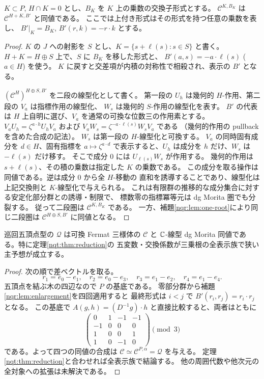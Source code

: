 \begin{lemma}[差ベクトルを加えるときの乗数]\label{nqr:lem:enlargement}
$K\subset P$, $H\cap K=0$ とし、$B_K$ を $K$ 上の乗数の交換子形式とする。
$\mathcal C^{K,B_K}$ は $\mathcal C^{H+K,B'}$ と同値である。
ここでは上付き形式はその形式を持つ任意の乗数を表し、
$B'|_K=B_K$, $B'(r,k)=-r\cdot k$ とする。
\end{lemma}
\begin{proof}
$K$ の $J$ への射影を $S$ とし、$K=\{s+\ell(s):s\in S\}$ と書く。
$H+K=H\oplus S$ 上で、$S$ に $B_K$ を移した形式と、
$B'(a,s)=-a\cdot\ell(s)$ ($a\in H$) を使う。
$K$ に戻すと交差項が内積の対称性で相殺され、表示の $B'$ となる。

$(\mathcal C^H)^{H\oplus S,B'}$ を二段の線型化として書く。
第一段の $U_h$ は幾何的 $H$-作用、第二段の $V_a$ は指標作用の線型化、
$W_s$ は幾何的 $S$-作用の線型化を表す。
$B'$ の代表は $H$ 上自明に選び、$V_a$ を通常の可換な位数三の作用素とする。
$V_aU_h=\zeta^{a\cdot h}U_hV_a$ および
$V_aW_s=\zeta^{-a\cdot\ell(s)}W_sV_a$ である
（幾何的作用の pullback を含めた合成の記法）。
$W_s$ は第一段の $H$-線型化と可換する。
$V_a$ の同時固有成分を $d\in H$、固有指標を $a\mapsto\zeta^{a\cdot d}$
で表示すると、$U_h$ は成分を $h$ だけ、$W_s$ は $-\ell(s)$ だけ移す。
そこで成分 $0$ には $U_{\ell(s)}W_s$ が作用する。
幾何的作用は $s+\ell(s)$、その積の乗数は指定した $K$ の乗数である。
この成分を取る操作は同値である。逆は成分 $0$ から全 $H$-移動の
直和を誘導することであり、線型化は上記交換則と $K$-線型化で与えられる。
これは有限群の推移的な成分集合に対する安定化部分群との誘導・制限で、
標数零の指標冪等元は dg Morita 圏でも分裂する。
従って二段圏は $\mathcal C^{K,B_K}$ である。
一方、補題\ref{nqr:lem:one-root}により同じ二段圏は
$\mathcal C^{H\oplus S,B'}$ に同値となる。
\end{proof}

\begin{theorem}\label{nqr:thm:cyclic-fermat}
巡回五頂点型の $\mathcal Q$ は可換 Fermat 三様体の $\mathcal C$ と
$\mathbb C$-線型 dg Morita 同値である。特に定理\ref{nqt:thm:reduction}の
五変数・交換係数が三乗根の全表示族で狭い主予想が成立する。
\end{theorem}
\begin{proof}
次の順で差ベクトルを取る。
\[
 r_1=e_0-e_1,\quad r_2=e_0-e_3,\quad
 r_3=e_1-e_2,\quad r_4=e_1-e_4 .
\]
五頂点を結ぶ木の四辺なので $P$ の基底である。
零部分群から補題\ref{nqr:lem:enlargement}を四回適用すると
最終形式は $i<j$ で $B'(r_i,r_j)=r_i\cdot r_j$ となる。
この基底で $A(g,h)=(D^{-1}g)\cdot h$ と直接比較すると、両者はともに
\[
 \begin{pmatrix}0&1&-1&-1\\-1&0&0&0\\1&0&0&1\\1&0&-1&0\end{pmatrix}
 \pmod3
\]
である。よって四つの同値の合成は
$\mathcal C\simeq\mathcal C^{P,\alpha}=\mathcal Q$ を与える。
定理\ref{nqt:thm:reduction}と合わせれば全表示族で結論する。
他の周囲代数や他次元の全対象への拡張は未解決である。
\end{proof}
